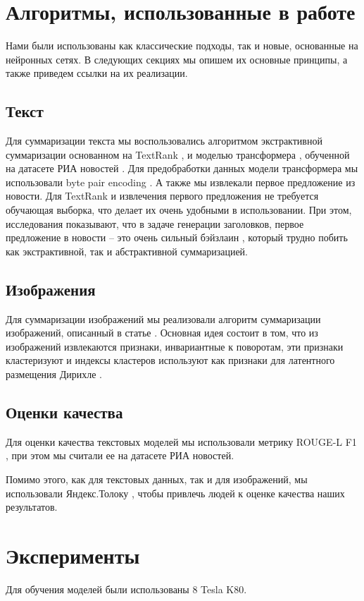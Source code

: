 \documentclass[aps,%
12pt,%
final,%
oneside,
onecolumn,%
musixtex, %
superscriptaddress,%
centertags]{article} %
\begin{document}
\section{Алгоритмы, использованные в работе}
Нами были использованы как классические подходы, так и новые, основанные на нейронных сетях.
В следующих секциях мы опишем их основные принципы, а также приведем ссылки на их реализации.

\subsection{Текст}
Для суммаризации текста мы воспользовались алгоритмом экстрактивной суммаризации
основанном на TextRank \cite{}, и моделью трансформера \cite{}, обученной на
датасете РИА новостей \cite{}. Для предобработки данных модели трансформера мы
использовали byte pair encoding \cite{}.
А также мы извлекали первое предложение из новости.
Для TextRank и извлечения первого предложения не требуется обучающая выборка, что
делает их очень удобными в использовании. При этом, исследования показывают, что
в задаче генерации заголовков, первое предложение в новости -- это очень сильный бэйзлаин \cite{},
который трудно побить как экстрактивной, так и абстрактивной суммаризацией.

\subsection{Изображения}
Для суммаризации изображений мы реализовали алгоритм суммаризации изображений,
описанный в статье \cite{}. Основная идея состоит в том, что из изображений извлекаются
признаки, инвариантные к поворотам, эти признаки кластеризуют и индексы кластеров
используют как признаки для латентного размещения Дирихле \cite{}.

\subsection{Оценки качества}
Для оценки качества текстовых моделей мы использовали метрику ROUGE-L F1 \cite{}, при этом
мы считали ее на датасете РИА новостей.

Помимо этого, как для текстовых данных, так и для изображений, мы  использовали
Яндекс.Толоку \cite{}, чтобы привлечь людей к оценке качества наших результатов.

\section{Эксперименты}
Для обучения моделей были использованы 8 Tesla K80. 
\end{document}
